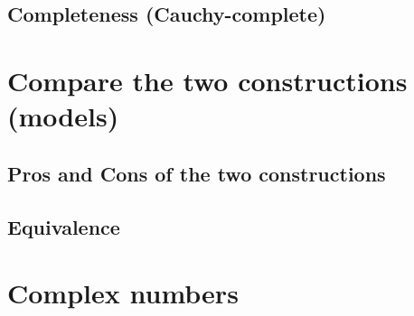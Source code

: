 \subsection{Completeness (Cauchy-complete)}

\section{Compare the two constructions (models)}

\subsection{Pros and Cons of the two constructions}

\subsection{Equivalence}

\section{Complex numbers}
